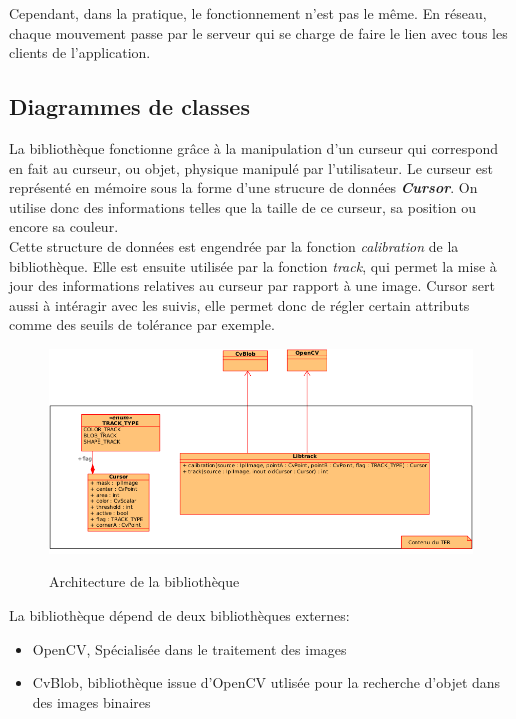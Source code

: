 \documentclass{report}
\begin{document}
				Cependant, dans la pratique, le fonctionnement n'est pas le même. En réseau, chaque mouvement passe par le serveur qui se charge de faire le lien avec tous les clients de l'application.

			\newpage
			\subsection{Diagrammes de classes}
				La bibliothèque fonctionne grâce à la manipulation d'un curseur qui correspond en fait au curseur, ou objet, physique manipulé par l'utilisateur.
				Le curseur est représenté en mémoire sous la forme d'une strucure de données \textbf{\textit{Cursor}}. On utilise donc des informations telles que la taille de ce curseur, sa position ou encore sa couleur.\\
				Cette structure de données est engendrée par la fonction \textit{calibration} de la bibliothèque. Elle est ensuite utilisée par la fonction \textit{track}, qui permet la mise à jour des informations relatives au curseur par rapport à une image. Cursor sert aussi à intéragir avec les suivis, elle permet donc de régler certain attributs comme des seuils de tolérance par exemple. \\
				\begin{figure}[!h]
						\centering
						\includegraphics[scale=0.8]{../images/libtrack-uml.png}\\
						\caption{Architecture de la bibliothèque}
						\label{Architecture de la bibliothèque}
				\end{figure}
				

				La bibliothèque dépend de deux bibliothèques externes:
				\begin{itemize}
					\item OpenCV, Spécialisée dans le traitement des images
					\item CvBlob, bibliothèque issue d'OpenCV utlisée pour la recherche d'objet dans des images binaires
				\end{itemize}
\end{document}
